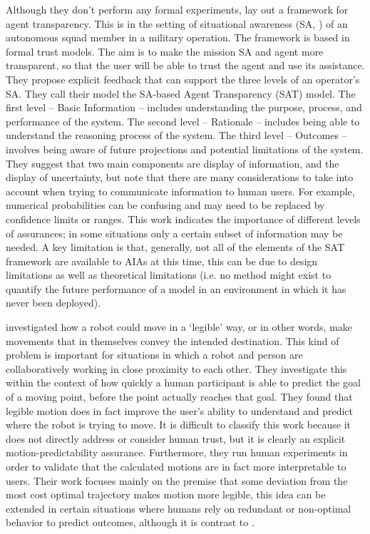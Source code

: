 Although they don't perform any formal experiments, \citet{Chen2014-dk} lay out a framework for agent transparency. This is in the setting of situational awareness (SA, \cite{Endsley1995-ie}) of an autonomous squad member in a military operation. The framework is based in formal trust models. The aim is to make the mission SA and agent more transparent, so that the user will be able to trust the agent and use its assistance. They propose explicit feedback that can support the three levels of an operator's SA. They call their model the SA-based Agent Transparency (SAT) model. The first level -- Basic Information -- includes understanding the purpose, process, and performance of the system. The second level -- Rationale -- includes being able to understand the reasoning process of the system. The third level -- Outcomes -- involves being aware of future projections and potential limitations of the system. They suggest that two main components are display of information, and the display of uncertainty, but note that there are many considerations to take into account when trying to communicate information to human users. For example, numerical probabilities can be confusing and may need to be replaced by confidence limits or ranges. This work indicates the importance of different levels of assurances; in some situations only a certain subset of information may be needed. A key limitation is that, generally, not all of the elements of the SAT framework are available to AIAs at this time, this can be due to design limitations as well as theoretical limitations (i.e. no method might exist to quantify the future performance of a model in an environment in which it has never been deployed).

\citet{Dragan2013-wd} investigated how a robot could move in a `legible' way, or in other words, make movements that in themselves convey the intended destination. This kind of problem is important for situations in which a robot and person are collaboratively working in close proximity to each other. They investigate this within the context of how quickly a human participant is able to predict the goal of a moving point, before the point actually reaches that goal. They found that legible motion does in fact improve the user's ability to understand and predict where the robot is trying to move. It is difficult to classify this work because it does not directly address or consider human trust, but it is clearly an explicit motion-predictability assurance. Furthermore, they run human experiments in order to validate that the calculated motions are in fact more interpretable to users. Their work focuses mainly on the premise that some deviation from the most cost optimal trajectory makes motion more legible, this idea can be extended in certain situations where humans rely on redundant or non-optimal behavior to predict outcomes, although it is contrast to \citet{Wu2016-ei}.

